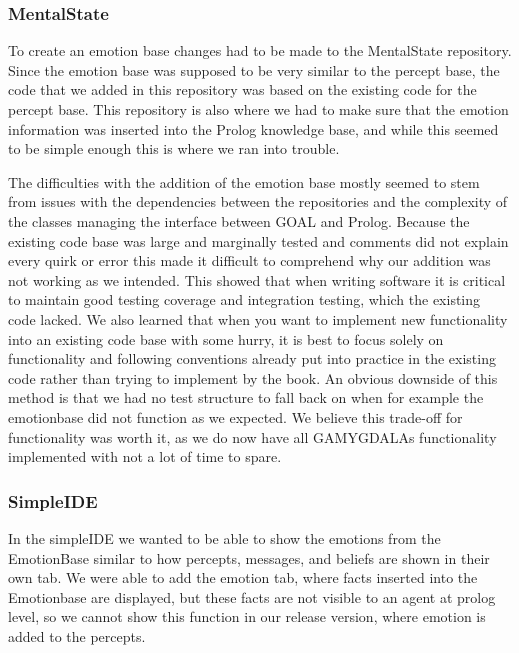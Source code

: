 \documentclass[11pt]{article}
\begin{document}
\subsubsection{MentalState}
To create an emotion base changes had to be made to the MentalState repository. Since the emotion base was supposed to be very similar to the percept base, the code that we added in this repository was based on the existing code for the percept base. This repository is also where we had to make sure that the emotion information was inserted into the Prolog knowledge base, and while this seemed to be simple enough this is where we ran into trouble. \par 
The difficulties with the addition of the emotion base mostly seemed to stem from issues with the dependencies between the repositories and the complexity of the classes managing the interface between GOAL and Prolog. Because the existing code base was large and marginally tested and comments did not explain every quirk or error this made it difficult to comprehend why our addition was not working as we intended. This showed that when writing software it is critical to maintain good testing coverage and integration testing, which the existing code lacked. We also learned that when you want to implement new functionality into an existing code base with some hurry, it is best to focus solely on functionality and following conventions already put into practice in the existing code rather than trying to implement by the book. An obvious downside of this method is that we had no test structure to fall back on when for example the emotionbase did not function as we expected. We believe this trade-off for functionality was worth it, as we do now have all GAMYGDALAs functionality implemented with not a lot of time to spare.
\subsubsection{SimpleIDE}
In the simpleIDE we wanted to be able to show the emotions from the EmotionBase similar to how percepts, messages, and beliefs are shown in their own tab. We were able to add the emotion tab, where facts inserted into the Emotionbase are displayed, but these facts are not visible to an agent at prolog level, so we cannot show this function in our release version, where emotion is added to the percepts.
\end{document}
